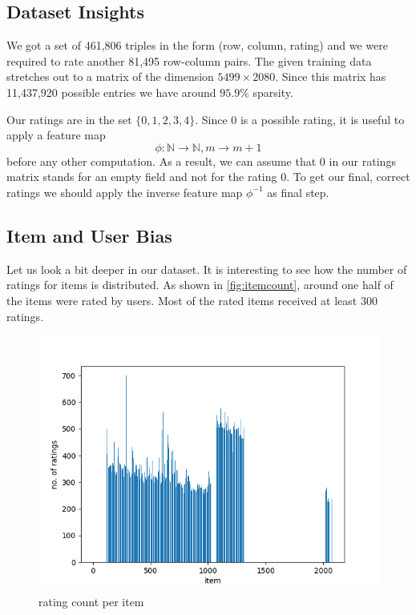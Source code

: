 \documentclass[DIV=14,twocolumn]{scrartcl}
\begin{document}
\subsection{Dataset Insights}\label{datsetinsight}
We got a set of 461,806 triples in the form (row, column, rating) and we were required to rate another 81,495 row-column pairs. 
The given training data stretches out to a matrix of the dimension $5499\times 2080$. Since this matrix has 11,437,920 possible entries we have around $95.9\%$ sparsity.

Our ratings are in the set $\{0,1,2,3,4\}$. Since 0 is a possible rating, it is useful to apply a feature map $$\phi:\mathbb{N}\rightarrow\mathbb{N},m\rightarrow m+1$$ before any other computation. As a result, we can assume that 0 in our ratings matrix stands for an empty field and not for the rating 0. To get our final, correct ratings we should apply the inverse feature map $\phi^{-1}$ as final step.

\subsection{Item and User Bias}\label{bias}
Let us look a bit deeper in our dataset. It is interesting to see how the number of ratings for items is distributed. As shown in \autoref{fig:itemcount}, around one half of the items were rated by users. Most of the rated items received at least 300 ratings. 
\begin{figure}[h]
	\includegraphics[width=\columnwidth]{../img/item-count}
	\caption{rating count per item}
	\label{fig:itemcount}
\end{figure}
\end{document}
